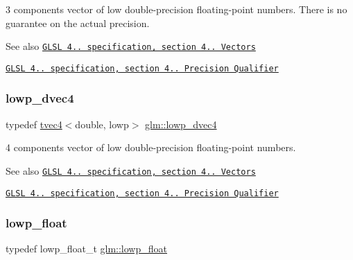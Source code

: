 3 components vector of low double-\/precision floating-\/point numbers. There is no guarantee on the actual precision.

\begin{DoxySeeAlso}{See also}
\href{http://www.opengl.org/registry/doc/GLSLangSpec.4.20.8.pdf}{\tt G\+L\+SL 4.. specification, section 4.. Vectors} 

\href{http://www.opengl.org/registry/doc/GLSLangSpec.4.20.8.pdf}{\tt G\+L\+SL 4.. specification, section 4.. Precision Qualifier} 
\end{DoxySeeAlso}
\mbox{\label{group__core__precision_gaed0097453a4f8b1f3dcf7476aee881cd}} 
\subsubsection{\texorpdfstring{lowp\+\_\+dvec4}{lowp\_dvec4}}
{\footnotesize\ttfamily typedef \hyperlink{structglm_1_1tvec4}{tvec4}$<$double, lowp$>$ \hyperlink{group__core__precision_gaed0097453a4f8b1f3dcf7476aee881cd}{glm\+::lowp\+\_\+dvec4}}

4 components vector of low double-\/precision floating-\/point numbers.

\begin{DoxySeeAlso}{See also}
\href{http://www.opengl.org/registry/doc/GLSLangSpec.4.20.8.pdf}{\tt G\+L\+SL 4.. specification, section 4.. Vectors} 

\href{http://www.opengl.org/registry/doc/GLSLangSpec.4.20.8.pdf}{\tt G\+L\+SL 4.. specification, section 4.. Precision Qualifier} 
\end{DoxySeeAlso}
\mbox{\label{group__core__precision_ga2887fbc729ac5c1c5caeb7cd57a7145c}} 
\subsubsection{\texorpdfstring{lowp\+\_\+float}{lowp\_float}}
{\footnotesize\ttfamily typedef lowp\+\_\+float\+\_\+t \hyperlink{group__core__precision_ga2887fbc729ac5c1c5caeb7cd57a7145c}{glm\+::lowp\+\_\+float}}

